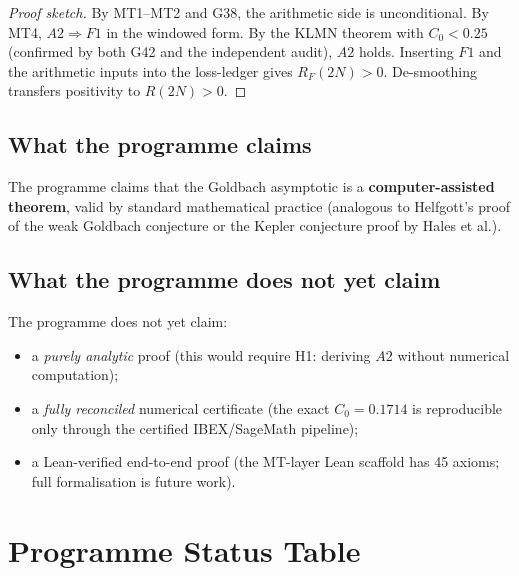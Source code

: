 \documentclass[11pt,a4paper]{article}
\begin{document}
\begin{proof}[Proof sketch]
By MT1--MT2 and G38, the arithmetic side is unconditional.  By MT4, $A2\Rightarrow F1$ in the windowed form.  By the KLMN theorem with $C_0<0.25$ (confirmed by both G42 and the independent audit), $A2$ holds.  Inserting $F1$ and the arithmetic inputs into the loss-ledger gives $R_F(2N)>0$.  De-smoothing transfers positivity to $R(2N)>0$.
\end{proof}

\subsection{What the programme claims}

The programme claims that the Goldbach asymptotic is a \textbf{computer-assisted theorem}, valid by standard mathematical practice (analogous to Helfgott's proof of the weak Goldbach conjecture or the Kepler conjecture proof by Hales et al.).

\subsection{What the programme does not yet claim}

The programme does not yet claim:
\begin{itemize}[nosep]
    \item a \emph{purely analytic} proof (this would require H1: deriving $A2$ without numerical computation);
    \item a \emph{fully reconciled} numerical certificate (the exact $C_0=0.1714$ is reproducible only through the certified IBEX/SageMath pipeline);
    \item a Lean-verified end-to-end proof (the MT-layer Lean scaffold has 45 axioms; full formalisation is future work).
\end{itemize}

\section{Programme Status Table}
\end{document}
